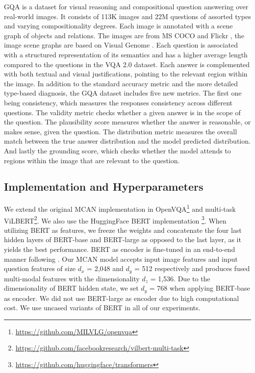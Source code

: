 \documentclass{article}
\begin{document}
GQA is a dataset \citet{hudson2019gqa} for visual reasoning and compositional question answering over real-world images. It consists of 113K images and 22M questions of assorted types and varying compositionality degrees. Each image is annotated with a scene graph of objects and relations. The images are from MS COCO \citep{coco} and Flickr \citep{thomee2016flickr}, the image scene graphs are based on Visual Genome \citep{krishnavisualgenome}. Each question is associated with a structured representation of its semantics and has a higher average length compared to the questions in the VQA 2.0 dataset. Each answer is complemented with both textual and visual justifications, pointing to the relevant region within the image. In addition to the standard accuracy metric and the more detailed type-based diagnosis, the GQA dataset includes five new metrics. The first one being consistency, which measures the responses consistency across different questions. The validity metric checks whether a given answer is in the scope of the question. The plausibility score measures whether the answer is reasonable, or makes sense, given the question. The distribution metric measures the overall match between the true answer distribution and the model predicted distribution. And lastly the grounding score, which checks whether the model attends to regions within the image that are relevant to the question.

\subsection{Implementation and Hyperparameters}
We extend the original MCAN implementation in OpenVQA\footnote{\url{https://github.com/MILVLG/openvqa}} and multi-task ViLBERT\footnote{\url{https://github.com/facebookresearch/vilbert-multi-task}}. We also use the HuggingFace BERT implementation \citep{wolf2019huggingfaces}\footnote{\url{https://github.com/huggingface/transformers}}. When utilizing BERT as features, we freeze the weights and concatenate the four last hidden layers of BERT-base and BERT-large as opposed to the last layer, as it yields the best performance. BERT as encoder is fine-tuned in an end-to-end manner following \citep{devlin-etal-2019-bert}. Our MCAN model accepts input image features and input question features of size $d_{x}$ = 2,048 and $d_{y}$ = 512 respectively and produces fused multi-modal features with the dimensionality $d_{z}$ = 1,536. Due to the dimensionality of BERT hidden state, we set $d_{y}$ = 768 when applying BERT-base as encoder. We did not use BERT-large as encoder due to high computational cost. We use uncased variants of BERT in all of our experiments.
\end{document}
